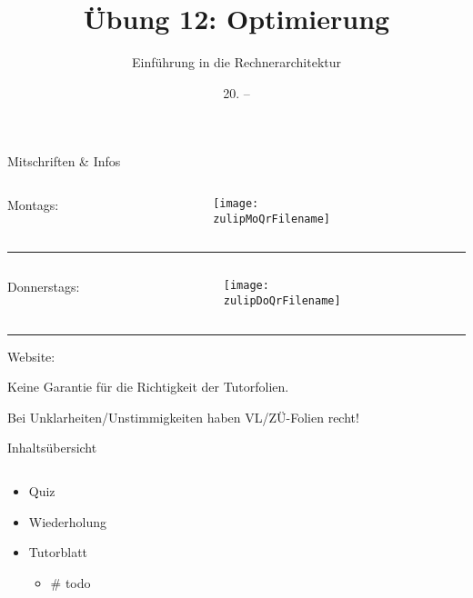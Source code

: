 \documentclass[
  german,            %
  aspectratio=169,    %
]{tumbeamer}
\title{Übung 12: Optimierung}
\subtitle{Einführung in die Rechnerarchitektur}
\author{\theAuthorName}
\institute{\theGroupName\\\theSchoolName\\\theUniversityName}
\date{20. -- \DTMdisplaydate{2025}{01}{26}{-1}}
\begin{document}
\maketitle

\begin{frame}[c]{Mitschriften \& Infos}{}
  \begin{minipage}[t]{\textwidth}
    \begin{columns}[c]
      \begin{column}{0.8\textwidth}
        Montags: \href{\zulipMo}{\zulipMo}
      \end{column}
      \begin{column}{0.2\textwidth}
        \texttt{[image: \\zulipMoQrFilename]}
      \end{column}
    \end{columns}
  \end{minipage}
  \rule{\textwidth}{0.4pt}
  \begin{minipage}[t]{\textwidth}
    \begin{columns}[c]
      \begin{column}{0.8\textwidth}
        Donnerstags: \href{\zulipDo}{\zulipDo}
      \end{column}
      \begin{column}{0.2\textwidth}
        \texttt{[image: \\zulipDoQrFilename]}
      \end{column}
    \end{columns}
  \end{minipage}
  \ifdefined\myWebsite
  \rule{\textwidth}{0.4pt}
  \centering
  Website: \href{\myWebsite}{\myWebsite}
  \fi
\end{frame}

\begin{frame}[c]{}{}
  \begin{center}
    \LARGE  Keine Garantie für die Richtigkeit der Tutorfolien.

    \Large Bei Unklarheiten/Unstimmigkeiten haben VL/ZÜ-Folien recht!
  \end{center}
\end{frame}

\begin{frame}[c]{Inhaltsübersicht}{}
  \begin{columns}[c]
    \begin{column}{1\textwidth}
      \begin{itemize}
        \item Quiz
        \item Wiederholung
        \item Tutorblatt
        \begin{itemize}
			\item \# todo
        \end{itemize}
      \end{itemize}
    \end{column}
  \end{columns}
\end{frame}
\end{document}
